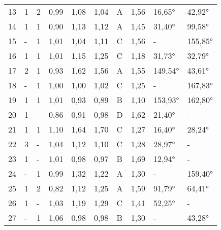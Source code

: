 \begin{longtable}{p{0.7cm}p{1.4cm}p{1.4cm}p{1cm}p{1cm}p{1cm}p{1cm}p{1cm}p{1cm}p{1cm}}
\small{13} & \small{1} & \small{2} & \small{0,99} & \small{1,08} & \small{1,04} & \small{A} & \small{1,56} & \small{16,65°} & \small{42,92°}\\
\small{14} & \small{1} & \small{1} & \small{0,90} & \small{1,13} & \small{1,12} & \small{A} & \small{1,45} & \small{31,40°} & \small{99,58°}\\
\small{15} & \small{-} & \small{1} & \small{1,01} & \small{1,04} & \small{1,11} & \small{C} & \small{1,56} & \small{-} & \small{155,85°}\\
\small{16} & \small{1} & \small{1} & \small{1,01} & \small{1,15} & \small{1,25} & \small{C} & \small{1,18} & \small{31,73°} & \small{32,79°}\\
\small{17} & \small{2} & \small{1} & \small{0,93} & \small{1,62} & \small{1,56} & \small{A} & \small{1,55} & \small{149,54°} & \small{43,61°}\\
\small{18} & \small{-} & \small{1} & \small{1,00} & \small{1,00} & \small{1,02} & \small{C} & \small{1,25} & \small{-} & \small{167,83°}\\
\small{19} & \small{1} & \small{1} & \small{1,01} & \small{0,93} & \small{0,89} & \small{B} & \small{1,10} & \small{153,93°} & \small{162,80°}\\
\small{20} & \small{1} & \small{-} & \small{0,86} & \small{0,91} & \small{0,98} & \small{D} & \small{1,62} & \small{21,40°} & \small{-}\\
\small{21} & \small{1} & \small{1} & \small{1,10} & \small{1,64} & \small{1,70} & \small{C} & \small{1,27} & \small{16,40°} & \small{28,24°}\\
\small{22} & \small{3} & \small{-} & \small{1,04} & \small{1,12} & \small{1,10} & \small{C} & \small{1,28} & \small{28,97°} & \small{-}\\
\small{23} & \small{1} & \small{-} & \small{1,01} & \small{0,98} & \small{0,97} & \small{B} & \small{1,69} & \small{12,94°} & \small{-}\\
\small{24} & \small{-} & \small{1} & \small{0,99} & \small{1,32} & \small{1,22} & \small{A} & \small{1,30} & \small{-} & \small{159,40°}\\
\small{25} & \small{1} & \small{2} & \small{0,82} & \small{1,12} & \small{1,25} & \small{A} & \small{1,59} & \small{91,79°} & \small{64,41°}\\
\small{26} & \small{1} & \small{-} & \small{1,03} & \small{1,19} & \small{1,29} & \small{C} & \small{1,41} & \small{52,25°} & \small{-}\\
\small{27} & \small{-} & \small{1} & \small{1,06} & \small{0,98} & \small{0,98} & \small{B} & \small{1,30} & \small{-} & \small{43,28°}\\

\end{longtable}
